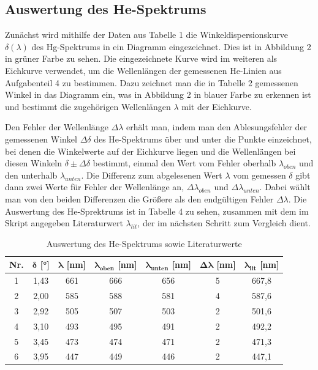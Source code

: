 \documentclass{article}
\begin{document}
\subsection{Auswertung des He-Spektrums}

Zunächst wird mithilfe der Daten aus Tabelle 1 die Winkeldispersionskurve $\delta (\lambda)$ des Hg-Spektrums in ein Diagramm eingezeichnet. Dies ist in Abbildung 2 in grüner Farbe zu sehen. Die eingezeichnete Kurve wird im weiteren als Eichkurve verwendet, um die Wellenlängen der gemessenen He-Linien aus Aufgabenteil 4 zu bestimmen. Dazu zeichnet man die in Tabelle 2 gemessenen Winkel in das Diagramm ein, was in Abbildung 2 in blauer Farbe zu erkennen ist und bestimmt die zugehörigen Wellenlängen $\lambda$ mit der Eichkurve. 

Den Fehler der Wellenlänge $\Delta \lambda$ erhält man, indem man den Ablesungsfehler der gemessenen Winkel $\Delta \delta$ des He-Spektrums über und unter die Punkte einzeichnet, bei denen die Winkelwerte auf der Eichkurve liegen und die Wellenlängen bei diesen Winkeln $\delta \pm \Delta \delta$ bestimmt, einmal den Wert vom Fehler oberhalb $\lambda_{oben}$ und den unterhalb $\lambda_{unten}$. Die Differenz zum abgelesenen Wert $\lambda$ vom gemessen $\delta$ gibt dann zwei Werte für Fehler der Wellenlänge an, $\Delta \lambda_{oben}$ und $\Delta \lambda_{unten}$. Dabei wählt man von den beiden Differenzen die Größere als den endgültigen Fehler $\Delta \lambda$. Die Auswertung des He-Sprektrums ist in Tabelle 4 zu sehen, zusammen mit dem im Skript angegeben Literaturwert $\lambda_{lit}$, der im nächsten Schritt zum Vergleich dient.

\begin{table}[h]
\centering
\caption{Auswertung des He-Spektrums sowie Literaturwerte}
\begin{tabular}{c|c|c|c|c|c|c}
\textbf{Nr.} & $\bm{\delta}$ [°] & $\bm{\lambda}$ [nm] & $\bm{\lambda_{oben}}$ [nm] & $\bm{\lambda_{unten}}$ [nm] & $\bm{\Delta \lambda}$ [nm] & $\bm{\lambda_{lit}}$ [nm] \\ \hline
       1   &      1,43     &     661      &      666     &      656     &     5      &     667,8      \\
       2   &      2,00     &     585      &      588     &      581     &     4      &     587,6      \\
       3   &      2,92     &     505      &      507     &      503     &     2      &     501,6      \\
       4   &      3,10     &     493      &      495     &      491     &     2      &     492,2      \\
       5   &      3,45     &     473      &      474     &      471     &     2      &     471,3      \\
       6   &      3,95     &     447      &      449     &      446     &     2      &     447,1     
\end{tabular}
\end{table}
\end{document}
